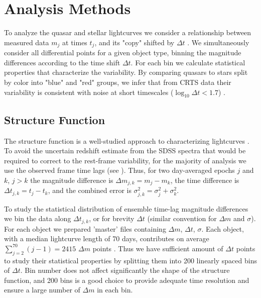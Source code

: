 \documentclass[fleqn,usenatbib]{mnras}  %
\begin{document}
\section{Analysis Methods}
\label{sec:analysis}
To analyze the quasar and stellar lightcurves we consider a relationship between measured data $m_{j}$  at times $t_{j}$, and its "copy" shifted by $\Delta  t$ \citep{kozlowski2016}. We simultaneously consider all differential points for a given object type, binning the magnitude differences according to the time shift  $\Delta t$.  For each bin we calculate  statistical properties that characterize the variability. By comparing quasars to stars split by color into "blue" and "red" groups, we infer that from CRTS data their variability is consistent with noise at short timescales ($\log_{10}\Delta t < 1.7 $) . 

\subsection{Structure Function}
The structure function is a well-studied approach to characterizing lightcurves \citep{berk2004, devries2005, kozlowski2016, graham2013} . To avoid the uncertain redshift estimate from the SDSS spectra that would be required to correct to the rest-frame variability, for the majority of analysis we use the observed frame time lags (see \cite{schmidt2010, kozlowski2016}).   Thus, for two day-averaged epochs $j$ and $k$, $j > k$ the  magnitude difference is $\Delta m_{j,k} = m_{j} - m_{k}$, the time difference is  $\Delta t_{j,k} = t_{j} - t_{k}$, and the combined error is $\sigma_{j,k}^{2} = \sigma_{j}^{2} + \sigma_{k}^{2}$. 

To study the statistical distribution of ensemble time-lag magnitude differences we bin the data along $\Delta t_{j,k} $, or for brevity  $\Delta t$ (similar convention for $\Delta m$ and $\sigma$). For each object  we prepared 'master' files containing $\Delta m$, $\Delta t$, $\sigma$. Each object, with a median lightcurve length of 70 days,  contributes on average $\sum_{j=2}^{70}{(j-1)} = 2415$  $\Delta m$ points . Thus we have sufficient amount of $\Delta t$ points to study their statistical properties by splitting them into 200 linearly spaced bins of  $\Delta t$. Bin number does not affect significantly the shape of the structure function, and 200 bins is a good choice to provide adequate time resolution and ensure a large number of  $\Delta m$ in each bin.
\end{document}
